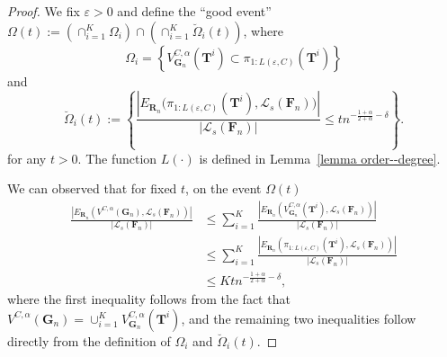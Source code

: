 \documentclass[twoside,11pt]{article}
\theoremstyle{remark}
\begin{document}
\begin{proof}
We fix $\varepsilon>0$ and define the ``good event'' $\Omega\left(t\right):=\left(\cap_{i=1}^K {\Omega}_i\right) \cap\left(\cap_{i=1}^K \breve{\Omega}_i\left(t\right)\right)$,
where
%
\begin{equation*}
   \Omega_i=\left\{ V^{C,\alpha}_{\boldsymbol{G}_n}\left(\boldsymbol{T}^i\right)\subset\pi_{1:{L\left(\varepsilon, C\right)}}\left(\boldsymbol{T}^i\right)\right\} 
\end{equation*}
%
and 
%
\begin{equation*}
\breve{\Omega}_i\left(t\right):=\left\{\frac{\left|E_{\boldsymbol{R}_n}\bigl(\pi_{1:{L\left(\varepsilon, C\right)}}(\boldsymbol{T}^i), \mathcal{L}_s\left(\boldsymbol{F}_n\right)\bigr)\right|}{\left| \mathcal{L}_s\left(\boldsymbol{F}_n\right)\right|}\le tn^{-\frac{1+\alpha}{2+\alpha}-\delta}\right\}.  
\end{equation*}
%
for any $t>0$. The function $L(\cdot)$ is defined in Lemma~\ref{lemma order--degree}.

We can observed that for fixed $t$, on the event ${\Omega}\left(t\right)$
%
\begin{equation*}
\begin{aligned}
\frac{\left|E_{\boldsymbol{R}_n}\left(V^{C, \alpha}\left(\boldsymbol{G}_n\right), \mathcal{L}_s\left(\boldsymbol{F}_n\right)\right)\right|}{\left| \mathcal{L}_s\left(\boldsymbol{F}_n\right)\right|}
&\leq\sum_{i=1}^K\frac{\left|E_{\boldsymbol{R}_n}\left(V_{\bm{G}_n}^{C, \alpha}\left(\boldsymbol{T}^i\right), \mathcal{L}_s\left(\boldsymbol{F}_n\right)\right)\right|}{\left| \mathcal{L}_s\left(\boldsymbol{F}_n\right)\right|}\\
&\le \sum_{i=1}^K\frac{\left|E_{\boldsymbol{R}_n}\left(\pi_{1:{L\left(\varepsilon, C\right)}}\left(\boldsymbol{T}^i\right), \mathcal{L}_s\left(\boldsymbol{F}_n\right)\right)\right|}{\left| \mathcal{L}_s\left(\boldsymbol{F}_n\right)\right|}\\
&\le K tn^{-\frac{1+\alpha}{2+\alpha}-\delta},    
\end{aligned}    
\end{equation*}
%
where the first inequality follows from the fact that $V^{C,\alpha}\left(\boldsymbol{G}_{n}\right)=\cup_{i=1}^K V^{C,\alpha}_{\boldsymbol{G}_n}\left(\boldsymbol{T}^i\right)$, and the remaining two inequalities follow directly from the definition of $\Omega_i$ and $\breve{\Omega}_i(t)$.



\end{proof}
\end{document}
